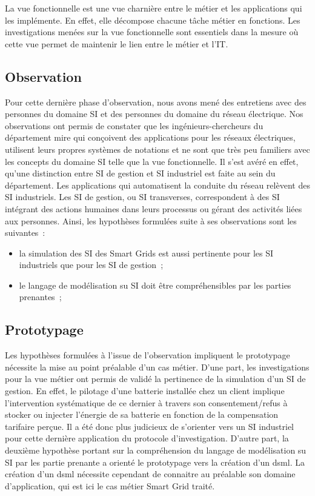 		La vue fonctionnelle est une vue charnière entre le métier et les applications qui les implémente. En effet, elle décompose chacune tâche métier en fonctions. Les investigations menées sur la vue fonctionnelle sont essentiels dans la mesure où cette vue permet de maintenir le lien entre le métier et l'IT. 
			\subsection{Observation}
		Pour cette dernière phase d'observation, nous avons mené des entretiens avec des personnes du domaine SI et des personnes du domaine du réseau électrique. Nos observations ont permis de constater que les ingénieurs-chercheurs du département \gls{mire} qui conçoivent des applications pour les réseaux électriques, utilisent leurs propres systèmes de notations et ne sont que très peu familiers avec les concepts du domaine SI telle que la vue fonctionnelle. Il s'est avéré en effet, qu'une distinction entre SI de gestion et SI industriel est faite au sein du département. Les applications qui automatisent la conduite du réseau relèvent des SI industriels. Les SI de gestion, ou SI transverses, correspondent à des SI intégrant des actions humaines dans leurs processus ou gérant des activités liées aux personnes.
		Ainsi, les hypothèses formulées suite à ses observations sont les suivantes~:
		\begin{itemize}
			\item la simulation des SI des Smart Grids est aussi pertinente pour les SI industriels que pour les SI de gestion~;
			\item le langage de modélisation su SI doit être compréhensibles par les parties prenantes~;
		\end{itemize}	 
			\subsection{Prototypage}
		Les hypothèses formulées à l'issue de l'observation impliquent le prototypage nécessite la mise au point préalable d'un cas métier. D'une part, les investigations pour la vue métier ont permis de validé la pertinence de la simulation d'un SI de gestion. En effet, le pilotage d'une batterie installée chez un client implique l'intervention systématique de ce dernier à travers son consentement/refus à stocker ou injecter l'énergie de sa batterie en fonction de la compensation tarifaire perçue. Il a été donc plus judicieux de s'orienter vers un SI industriel pour cette dernière application du protocole  d'investigation. D'autre part, la deuxième hypothèse portant sur la compréhension du langage de modélisation su SI par les partie prenante a orienté le prototypage vers la création d'un \gls{dsml}. La création d'un \gls{dsml} nécessite cependant de connaitre au préalable son domaine d'application, qui est ici le cas métier Smart Grid traité. 

